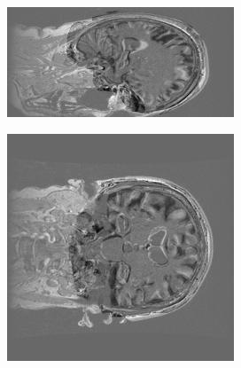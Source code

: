 \documentclass[11pt,a4paper,oneside]{report}
\begin{document}
\begin{figure}[H]
        \centering
        \begin{subfigure}[b]{0.3\textwidth}
                \includegraphics[width=\textwidth, height=0.8\textwidth, angle=90]{figures/diff/t1Aff_x.jpg}
        \end{subfigure}%
        \begin{subfigure}[b]{0.3\textwidth}
                \includegraphics[width=\textwidth, angle=90]{figures/diff/t1Aff_y.jpg}

\end{subfigure}
\end{figure}
\end{document}
